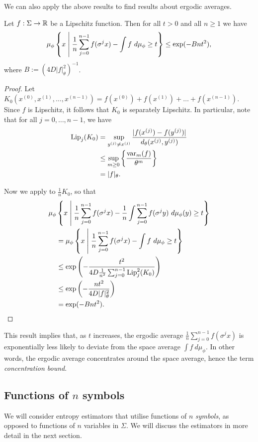 We can also apply the above results to find results about ergodic averages.

\begin{corollary}\label{cor:cm-3-3}
	Let $f : \Sigma \to \mathbb{R}$ be a Lipschitz function. Then for all $t > 0$ and all $n \geq 1$ we have
	\begin{equation}
		\mu_\phi\left\{x \mathrel{}\middle|\mathrel{} \frac{1}{n}\sum_{j = 0}^{n - 1}{f(\sigma^j{x})} - \int{f\ d\mu_\phi} \geq t\right\} \leq \exp(-Bnt^2),
	\end{equation}
	where $B := (4D|f|_\theta^2)^{-1}$.
	\begin{proof}
		Let $K_0(x^{(0)}, x^{(1)}, \dots, x^{(n - 1)}) = f(x^{(0)}) + f(x^{(1)}) + \dots + f(x^{(n - 1)})$. Since $f$ is Lipschitz, it follows that $K_0$ is separately Lipschitz. In particular, note that for all $j = 0, \dots, n - 1$, we have
		\begin{align*}
			\operatorname{Lip}_j(K_0) &= \sup_{y^{(j)} \neq x^{(j)}}{\frac{|f(x^{(j)}) - f(y^{(j)})|}{d_\theta(x^{(j)}, y^{(j)})}} \\
				&\leq \sup_{m \geq 0}\left\{\frac{\operatorname{var}_m(f)}{\theta^m}\right\} \\
				&= |f|_\theta.
		\end{align*}
		
		Now we apply  to $\frac{1}{n}K_0$, so that
		\begin{align*}
			\mu_\phi&\left\{x \mathrel{}\middle|\mathrel{} \frac{1}{n}\sum_{j = 0}^{n - 1}{f(\sigma^j{x})} - \frac{1}{n}\int{\sum_{j = 0}^{n - 1}{f(\sigma^j{y})}\ d\mu_\phi(y)} \geq t\right\} \\
			&=\mu_\phi\left\{x \mathrel{}\middle|\mathrel{} \frac{1}{n}\sum_{j = 0}^{n - 1}{f(\sigma^j{x})} - \int{f\ d\mu_\phi} \geq t\right\} \\
			&\leq \exp\left(-\frac{t^2}{4D\frac{1}{n^2}\sum_{j = 0}^{n - 1}{\operatorname{Lip}_j^2(K_0)}}\right) \\
			&\leq \exp\left(-\frac{nt^2}{4D|f|_\theta^2}\right) \\
			&= \exp(-Bnt^2).
		\end{align*}
	\end{proof}
\end{corollary}

This result implies that, as $t$ increases, the ergodic average $\frac{1}{n}\sum_{j = 0}^{n - 1}{f(\sigma^j{x})}$ is exponentially less likely to deviate from the space average $\int{f\ d\mu_\phi}$. In other words, the ergodic average concentrates around the space average, hence the term \emph{concentration bound}.

\subsection{Functions of \texorpdfstring{$n$}{n} symbols}
We will consider entropy estimators that utilise functions of $n$ \emph{symbols}, as opposed to functions of $n$ variables in $\Sigma$. We will discuss the estimators in more detail in the next section.

